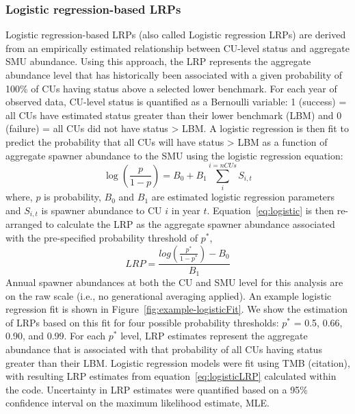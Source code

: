 \documentclass[11pt]{book}
\begin{document}
\hypertarget{logisticMethods}{%
\subsubsection{Logistic regression-based LRPs}\label{logisticMethods}}

Logistic regression-based LRPs (also called Logistic regression LRPs) are derived from an empirically estimated relationship between CU-level status and aggregate SMU abundance. Using this approach, the LRP represents the aggregate abundance level that has historically been associated with a given probability of 100\% of CUs having status above a selected lower benchmark. For each year of observed data, CU-level status is quantified as a Bernoulli variable: 1 (success) = all CUs have estimated status greater than their lower benchmark (LBM) and 0 (failure) = all CUs did not have status \textgreater{} LBM. A logistic regression is then fit to predict the probability that all CUs will have status \textgreater{} LBM as a function of aggregate spawner abundance to the SMU using the logistic regression equation:
\begin{equation}
  \log(\frac{p}{1-p}) = B_0 + B_1 \sum_{i}^{i=nCUs} S_{i,t}
   \label{eq:logistic}
\end{equation}
where, \(p\) is probability, \(B_0\) and \(B_1\) are estimated logistic regression parameters and \(S_{i,t}\) is spawner abundance to CU \(i\) in year \(t\). Equation~\ref{eq:logistic} is then re-arranged to calculate the LRP as the aggregate spawner abundance associated with the pre-specified probability threshold of \(p^*\),
\begin{equation}
  LRP = \frac{log(\frac{p^*}{1-p^*}) - B_0}{B_1}
  \label{eq:logisticLRP}
\end{equation}
Annual spawner abundances at both the CU and SMU level for this analysis are on the raw scale (i.e., no generational averaging applied). An example logistic regression fit is shown in Figure~\ref{fig:example-logisticFit}. We show the estimation of LRPs based on this fit for four possible probability thresholds: \(p^*\) = 0.5, 0.66, 0.90, and 0.99. For each \(p^*\) level, LRP estimates represent the aggregate abundance that is associated with that probability of all CUs having status greater than their LBM. Logistic regression models were fit using TMB (citation), with resulting LRP estimates from equation~\ref{eq:logisticLRP} calculated within the code. Uncertainty in LRP estimates were quantified based on a 95\% confidence interval on the maximum likelihood estimate, MLE.
\end{document}
